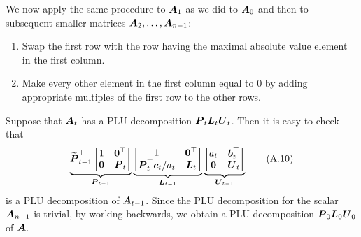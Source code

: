 We now apply the same procedure to \(\boldsymbol{A}_1\) as we did to \(\boldsymbol{A}_0\) and then to subsequent smaller matrices \(\boldsymbol{A}_2, \dots, \boldsymbol{A}_{n-1}\):
\begin{enumerate}
	\item Swap the first row with the row having the maximal absolute value element in the first column.
	\item Make every other element in the first column equal to 0 by adding appropriate multiples of the first row to the other rows.
\end{enumerate}
Suppose that \(\boldsymbol{A}_t\) has a PLU decomposition \(\boldsymbol{P}_t \boldsymbol{L}_t \boldsymbol{U}_t\). Then it is easy to check that
\begin{equation}
	\underbrace{\widetilde{\boldsymbol{P}}_{t-1}^\top
		\begin{bmatrix}
			1        & \boldsymbol{0}^\top \\
			\boldsymbol{0} & \boldsymbol{P}_t
		\end{bmatrix}}_{\boldsymbol{P}_{t-1}}
	\underbrace{
		\begin{bmatrix}
			1                              & \boldsymbol{0}^\top \\
			\boldsymbol{P}_t^\top \boldsymbol{c}_t / a_t & \boldsymbol{L}_t
		\end{bmatrix}}_{\boldsymbol{L}_{t-1}}
	\underbrace{
		\begin{bmatrix}
			a_t      & \boldsymbol{b}_t^\top \\
			\boldsymbol{0} & \boldsymbol{U}_t
		\end{bmatrix}}_{\boldsymbol{U}_{t-1}} \tag{A.10}
\end{equation}
is a PLU decomposition of \(\boldsymbol{A}_{t-1}\). Since the PLU decomposition for the scalar \(\boldsymbol{A}_{n-1}\) is trivial, by working backwards, we obtain a PLU decomposition \(\boldsymbol{P}_0 \boldsymbol{L}_0 \boldsymbol{U}_0\) of \(\boldsymbol{A}\).

